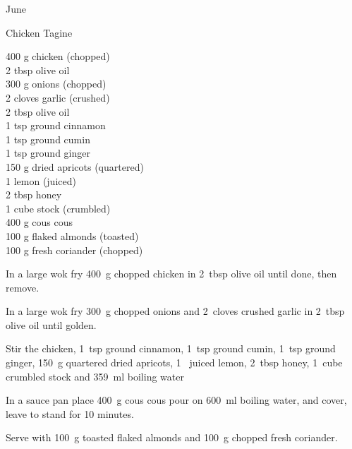 \begin{menu}{June}
    \begin{recipe}{2}{Chicken Tagine}%
		\begin{ingredients}
		400 g chicken (chopped) \\
	2 tbsp olive oil  \\
	300 g onions (chopped) \\
	2 cloves garlic (crushed) \\
	2 tbsp olive oil  \\
	1 tsp ground cinnamon  \\
	1 tsp ground cumin  \\
	1 tsp ground ginger  \\
	150 g dried apricots (quartered) \\
	1  lemon (juiced) \\
	2 tbsp honey  \\
	1 cube stock (crumbled) \\
	400 g cous cous  \\
	100 g flaked almonds (toasted) \\
	100 g fresh coriander (chopped) \\
	
		\end{ingredients}
	
    \begin{instructions}
    \item 
        In a large wok fry
        400~g chopped chicken
        in
        2~tbsp  olive oil
        until done, then remove.
      \item 
        In a large wok fry
        300~g chopped onions
        and
        2~cloves crushed garlic
        in
        2~tbsp  olive oil
        until golden.
      \item 
        Stir the chicken,
        1~tsp  ground cinnamon,
        1~tsp  ground cumin,
        1~tsp  ground ginger,
        150~g quartered dried apricots,
        1~ juiced lemon,
        2~tbsp  honey,
        1~cube crumbled stock
        and
        359~ml  boiling water\item 
      In a
      sauce pan 
      place
      400~g  cous cous
      pour on
      600~ml  boiling water,
      and cover, leave to stand for 10 minutes.
    \item 
        Serve with
        100~g toasted flaked almonds
        and
        100~g chopped fresh coriander.
      
    \end{instructions}
    \end{recipe}%
  

\end{menu}
